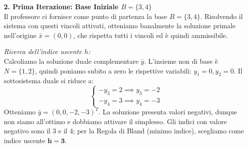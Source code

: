 \documentclass[12pt, a4paper]{article}
\begin{document}
	\vspace{0.4cm}
	\textbf{2. Prima Iterazione: Base Iniziale $B = \{3, 4\}$}\\
	Il professore ci fornisce come punto di partenza la base $B = \{3, 4\}$. Risolvendo il sistema con questi vincoli attivati, otteniamo banalmente la soluzione primale nell'origine $\bar{x} = (0, 0)$, che rispetta tutti i vincoli ed è quindi ammissibile.
	
	\textit{Ricerca dell'indice uscente $h$:}\\
	Calcoliamo la soluzione duale complementare $\bar{y}$. L'insieme non di base è $N = \{1, 2\}$, quindi poniamo subito a zero le rispettive variabili: $y_1 = 0, y_2 = 0$. Il sottosistema duale si riduce a:
	\[
	\begin{cases}
		-y_3 = 2 \implies y_3 = -2 \\
		-y_4 = 3 \implies y_4 = -3
	\end{cases}
	\]
	Otteniamo $\bar{y} = (0, 0, -2, -3)^T$. La soluzione presenta valori negativi, dunque non siamo all'ottimo e dobbiamo attivare il simplesso. Gli indici con valore negativo sono il 3 e il 4; per la Regola di Bland (minimo indice), scegliamo come indice uscente $\mathbf{h = 3}$.
	
\end{document}
